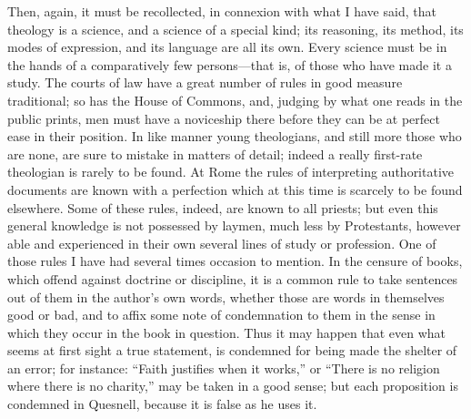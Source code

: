 Then, again, it must be recollected, in connexion with what I have
said, that theology is a science, and a science of a special kind; its
reasoning, its method, its modes of expression, and its language are all
its own. Every science must be in the hands of a comparatively few
persons—that is, of those who have made it a study. The courts of law
have a great number of rules in good measure traditional; so has the
House of Commons, and, judging by what one reads in the public prints,
men must have a noviceship there before they can be at perfect ease in
their position. In like manner young theologians, and still more those
who are none, are sure to mistake in matters of detail; indeed a really
first-rate theologian is rarely to be found. At Rome the rules of
interpreting authoritative documents are known with a perfection which
at this time is scarcely to be found elsewhere. Some of these rules,
indeed, are known to all priests; but even this general knowledge is not
possessed by laymen, much less by Protestants, however able and
experienced in their own several lines of study or profession. One
of those rules I have had several times occasion to mention. In the
censure of books, which offend against doctrine or discipline, it is a
common rule to take sentences out of them in the author's own words,
whether those are words in themselves good or bad, and to affix some
note of condemnation to them in the sense in which they occur in the
book in question. Thus it may happen that even what seems at first sight
a true statement, is condemned for being made the shelter of an error;
for instance: ``Faith justifies when it works,'' or ``There
is no religion where there is no charity,'' may be taken in a good
sense; but each proposition is condemned in Quesnell, because it is
false as he uses it.

